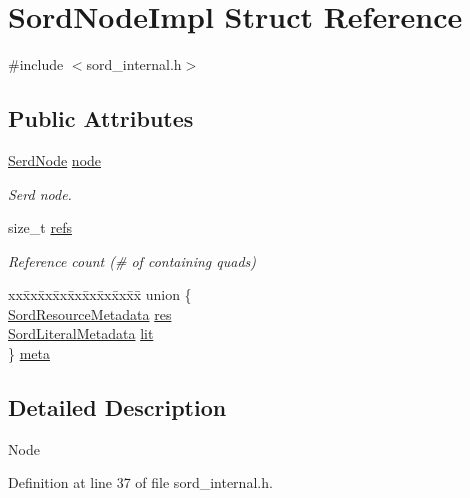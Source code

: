\hypertarget{struct_sord_node_impl}{}\section{Sord\+Node\+Impl Struct Reference}
\label{struct_sord_node_impl}


{\ttfamily \#include $<$sord\+\_\+internal.\+h$>$}

\subsection*{Public Attributes}
\begin{DoxyCompactItemize}
\item 
\hyperlink{struct_serd_node}{Serd\+Node} \hyperlink{struct_sord_node_impl_a92cfbbb49866b131b39ef8ac8b47a344}{node}
\begin{DoxyCompactList}\small\item\em Serd node. \end{DoxyCompactList}\item 
size\+\_\+t \hyperlink{struct_sord_node_impl_ab08e121f0b247be9521510a88ad56a9f}{refs}
\begin{DoxyCompactList}\small\item\em Reference count (\# of containing quads) \end{DoxyCompactList}\item 
\begin{tabbing}
xx\=xx\=xx\=xx\=xx\=xx\=xx\=xx\=xx\=\kill
union \{\\
\>\hyperlink{struct_sord_resource_metadata}{SordResourceMetadata} \hyperlink{struct_sord_node_impl_aca9cba6462ce61f6db49069fb52df4e1}{res}\\
\>\hyperlink{struct_sord_literal_metadata}{SordLiteralMetadata} \hyperlink{struct_sord_node_impl_a2b1bab2646fb3e4a17b24cb926df7884}{lit}\\
\} \hyperlink{struct_sord_node_impl_aabe7dd54ba242842ab3f0b3bc307c093}{meta}\\

\end{tabbing}\end{DoxyCompactItemize}


\subsection{Detailed Description}
Node 

Definition at line 37 of file sord\+\_\+internal.\+h.



